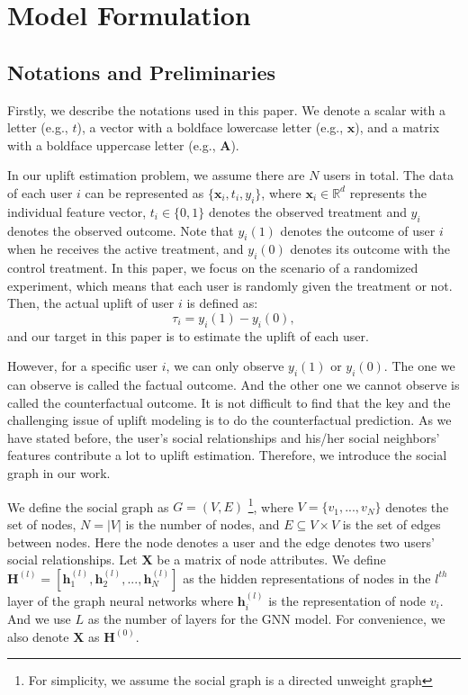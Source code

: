 \section{Model Formulation}

\subsection{Notations and Preliminaries}
Firstly, we describe the notations used in this paper. We denote a scalar with a letter (e.g., $t$), a vector with a boldface lowercase letter (e.g., $\mathbf{x}$), and a matrix with a boldface uppercase letter (e.g., $\mathbf{A}$).

In our uplift estimation problem, we assume there are $N$ users in total. The data of each user $i$ can be represented as $\{\mathbf{x}_i,t_i,y_i\}$, where $\mathbf{x}_i \in \mathbb{R}^d$ represents the individual feature vector, $t_i\in\{0,1\}$ denotes the observed treatment and $y_i$ denotes the observed outcome. Note that $y_i(1)$ denotes the outcome of user $i$ when he receives the active treatment, and $y_i(0)$ denotes its outcome  with the control treatment. In this paper, we focus on the scenario of a randomized experiment, which means that each user is randomly given the treatment or not. Then, the actual uplift of user $i$ is defined as: 
\begin{equation} \label{eq_up}
	\tau_i = y_i(1) - y_i(0),
\end{equation}
and our target in this paper is to estimate the uplift of each user. 

However, for a specific user $i$, we can only observe $y_i(1)$ or $y_i(0)$. The one we can observe is called the factual outcome. And the other one we cannot observe is called the counterfactual outcome. It is not difficult to find that the key and the challenging issue of uplift modeling is to do the counterfactual prediction. As we have stated before, the user's social relationships and his/her social neighbors' features contribute a lot to uplift estimation. Therefore, we introduce the social graph in our work. 

We define the social graph as $\mathit{G}=(\mathit{V},\mathit{E})$ \footnote{For simplicity, we assume the social graph is a directed unweight graph}, where $\mathit{V}=\{v_1,...,v_N\}$ denotes the set of nodes, $N = \left| \mathit{V} \right|$ is the number of nodes, and $\mathit{E} \subseteq \mathit{V} \times \mathit{V}$ is the set of edges between nodes. Here the node denotes a user and the edge denotes two users' social relationships.  Let $\mathbf{X}$ be a matrix of node attributes.
We define $\mathbf{H}^{(l)} = \left[ \mathbf{h}^{(l)}_1,\mathbf{h}^{(l)}_2,...,\mathbf{h}^{(l)}_N \right]$ as the hidden representations of nodes in the $l^{th}$ layer of the graph neural networks where $\mathbf{h}^{(l)}_i$ is the representation of node $v_i$. And we use $L$ as the number of layers for the GNN model. For convenience, we also denote $\mathbf{X}$ as $\mathbf{H}^{(0)}$. 

